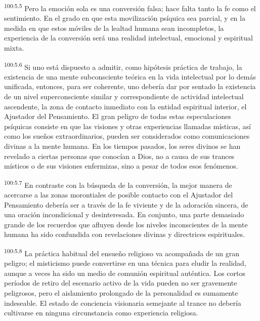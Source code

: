 \par
\textsuperscript{100:5.5} Pero la emoción sola es una conversión falsa; hace falta tanto la fe como el sentimiento. En el grado en que esta movilización psíquica sea parcial, y en la medida en que estos móviles de la lealtad humana sean incompletos, la experiencia de la conversión será una realidad intelectual, emocional y espiritual mixta.

\par
\textsuperscript{100:5.6} Si uno está dispuesto a admitir, como hipótesis práctica de trabajo, la existencia de una mente subconsciente teórica en la vida intelectual por lo demás unificada, entonces, para ser coherente, uno debería dar por sentado la existencia de un nivel superconsciente similar y correspondiente de actividad intelectual ascendente, la zona de contacto inmediato con la entidad espiritual interior, el Ajustador del Pensamiento. El gran peligro de todas estas especulaciones psíquicas consiste en que las visiones y otras experiencias llamadas místicas, así como los sueños extraordinarios, pueden ser considerados como comunicaciones divinas a la mente humana. En los tiempos pasados, los seres divinos se han revelado a ciertas personas que conocían a Dios, no a causa de sus trances místicos o de sus visiones enfermizas, sino a pesar de todos esos fenómenos.

\par
\textsuperscript{100:5.7} En contraste con la búsqueda de la conversión, la mejor manera de acercarse a las zonas morontiales de posible contacto con el Ajustador del Pensamiento debería ser a través de la fe viviente y de la adoración sincera, de una oración incondicional y desinteresada. En conjunto, una parte demasiado grande de los recuerdos que afluyen desde los niveles inconscientes de la mente humana ha sido confundida con revelaciones divinas y directrices espirituales.

\par
\textsuperscript{100:5.8} La práctica habitual del ensueño religioso va acompañada de un gran peligro; el misticismo puede convertirse en una técnica para eludir la realidad, aunque a veces ha sido un medio de comunión espiritual auténtica. Los cortos períodos de retiro del escenario activo de la vida pueden no ser gravemente peligrosos, pero el aislamiento prolongado de la personalidad es sumamente indeseable. El estado de conciencia visionaria semejante al trance no debería cultivarse en ninguna circunstancia como experiencia religiosa.

